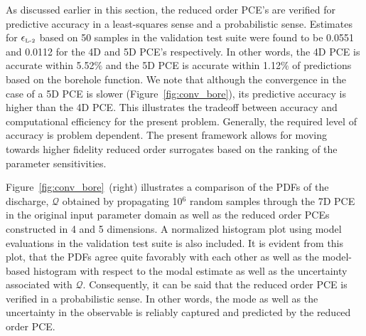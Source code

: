 As discussed earlier in this section, the reduced order PCE's are verified for
predictive accuracy in a least-squares sense and a probabilistic sense.
Estimates for $\epsilon_{\mbox{\tiny{L-2}}}$ based on 50 samples in the
validation test suite were
found to be 0.0551 and 0.0112 for the 4D and 5D PCE's respectively. In other
words, the 4D PCE is accurate within 5.52$\%$ and the 5D PCE is accurate within
1.12$\%$ of predictions based on the borehole function. We note  that although
the convergence in the case of a 5D PCE is slower (Figure~\ref{fig:conv_bore}),
its predictive accuracy is higher than the 4D PCE. This illustrates the
tradeoff between accuracy and computational efficiency for the present 
problem. Generally, the required level of accuracy is problem dependent. 
The present framework allows for moving towards higher fidelity 
reduced order surrogates based on the ranking of the parameter sensitivities. 
 


Figure~\ref{fig:conv_bore}~(right) illustrates a comparison of the PDFs
of the
discharge, $\mathcal{Q}$ obtained by propagating 10$^6$ random
samples through the 7D PCE in the original input parameter domain as well as
the reduced order PCEs constructed in 4 and 5 dimensions. A normalized histogram
plot using model evaluations in the validation test suite is also included.
It is evident from this plot, that the PDFs agree quite favorably with each
other as well as the model-based histogram with respect to the modal estimate
as well as the uncertainty associated with $\mathcal{Q}$. 
Consequently, it can be said that the reduced order PCE is verified in a
probabilistic sense. In other words, the mode as well as the uncertainty in the
observable is reliably captured and predicted by the reduced order PCE. 
% 
